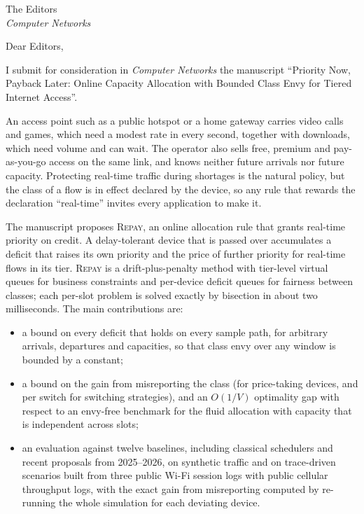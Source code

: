 \documentclass[11pt]{letter}
\date{November 18, 2026}
\begin{document}
\begin{letter}{The Editors\\\textit{Computer Networks}}
\opening{Dear Editors,}

I submit for consideration in \textit{Computer Networks} the manuscript ``Priority Now, Payback Later: Online Capacity Allocation with Bounded Class Envy for Tiered Internet Access''.

An access point such as a public hotspot or a home gateway carries video calls and games, which need a modest rate in every second, together with downloads, which need volume and can wait. The operator also sells free, premium and pay-as-you-go access on the same link, and knows neither future arrivals nor future capacity. Protecting real-time traffic during shortages is the natural policy, but the class of a flow is in effect declared by the device, so any rule that rewards the declaration ``real-time'' invites every application to make it.

The manuscript proposes \textsc{Repay}, an online allocation rule that grants real-time priority on credit. A delay-tolerant device that is passed over accumulates a deficit that raises its own priority and the price of further priority for real-time flows in its tier. \textsc{Repay} is a drift-plus-penalty method with tier-level virtual queues for business constraints and per-device deficit queues for fairness between classes; each per-slot problem is solved exactly by bisection in about two milliseconds. The main contributions are:
\begin{itemize}
\item a bound on every deficit that holds on every sample path, for arbitrary arrivals, departures and capacities, so that class envy over any window is bounded by a constant;
\item a bound on the gain from misreporting the class (for price-taking devices, and per switch for switching strategies), and an $O(1/V)$ optimality gap with respect to an envy-free benchmark for the fluid allocation with capacity that is independent across slots;
\item an evaluation against twelve baselines, including classical schedulers and recent proposals from 2025--2026, on synthetic traffic and on trace-driven scenarios built from three public Wi-Fi session logs with public cellular throughput logs, with the exact gain from misreporting computed by re-running the whole simulation for each deviating device.
\end{itemize}


\end{letter}
\end{document}
